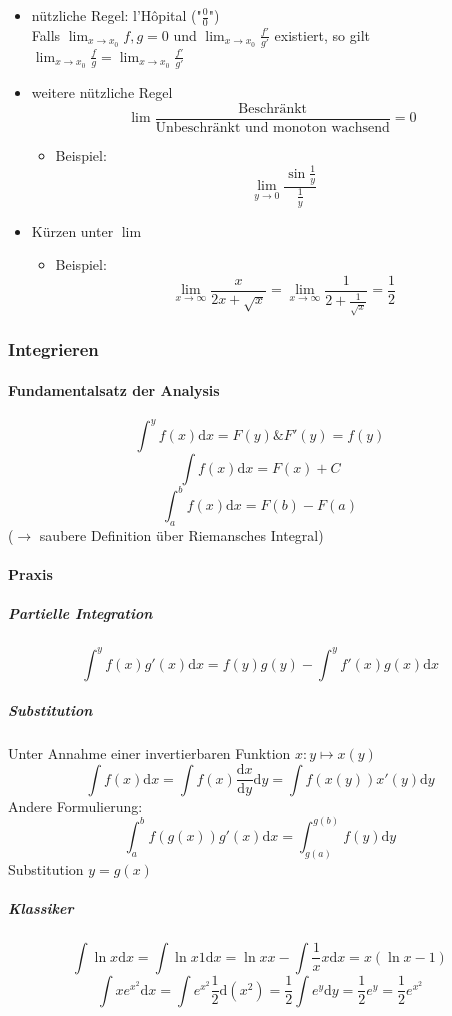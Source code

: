 \documentclass[a4paper]{scrartcl}
\theoremstyle{definition}
\theoremstyle{plain}
\theoremstyle{remark}
\theoremstyle{remark}
\begin{document}
\begin{itemize}
\begin{itemize}
\item nützliche Regel: l'Hôpital ("$\frac{0}{0}$") \\
        Falls $\lim_{x\to x_0} f,g = 0$ und $\lim_{x\to x_0} \frac{f'}{g'}$ existiert, so gilt $\lim_{x\to x_0}\frac{f}{g} = \lim_{x\to x_0} \frac{f'}{g'}$
\item weitere nützliche Regel \[\lim \frac{\text{Beschränkt}}{\text{Unbeschränkt und monoton wachsend}} = 0\]
\begin{itemize}
\item Beispiel: \[\lim_{y\to 0} \frac{\sin{\frac{1}{y}}}{\frac{1}{y}}\]
\end{itemize}
\item Kürzen unter $\lim$
\begin{itemize}
\item Beispiel: \[\lim_{x\to\infty} \frac{x}{2x + \sqrt{x}} = \lim_{x\to\infty}\frac{1}{2+\frac{1}{\sqrt{x}}} = \frac{1}{2}\]
\end{itemize}
\end{itemize}
\end{itemize}
\subsubsection{Integrieren}
\label{sec-2-2-3}
\paragraph{Fundamentalsatz der Analysis}
\label{sec-2-2-3-1}
\[\int^y f(x)\mathrm{d}x = F(y) \&  F'(y) = f(y)\]
\[\int f(x)\mathrm{d}x = F(x) + C\]
\[\int_a^b f(x)\mathrm{d}x = F(b) - F(a)\]
($\to$ saubere Definition über Riemansches Integral)
\paragraph{Praxis}
\label{sec-2-2-3-2}
\subparagraph{Partielle Integration}
\label{sec-2-2-3-2-1}
\[\int^y f(x)g'(x)\mathrm{d}x = f(y)g(y) - \int^y f'(x)g(x)\mathrm{d}x\]
\subparagraph{Substitution}
\label{sec-2-2-3-2-2}
Unter Annahme einer invertierbaren Funktion $x: y\mapsto x(y)$
\[\int f(x)\mathrm{d}x = \int f(x)\frac{\mathrm{d}x}{\mathrm{d}y}\mathrm{d}y = \int f(x(y)) x'(y)\mathrm{d}y\]
Andere Formulierung: \[\int_a^b f(g(x))g'(x)\mathrm{d}x = \int_{g(a)}^{g(b)}f(y)\mathrm{d}y\]
Substitution $y=g(x)$
\subparagraph{Klassiker}
\label{sec-2-2-3-2-3}
\[\int \ln{x}\mathrm{d}x = \int \ln{x}1\mathrm{d}x = \ln{x}x - \int \frac{1}{x}x\mathrm{d}x = x(\ln{x} - 1)\]
\[\int x e^{x^2}\mathrm{d}x = \int e^{x^2}\frac{1}{2}\mathrm{d}(x^2) = \frac{1}{2}\int e^y \mathrm{d}y = \frac{1}{2}e^y = \frac{1}{2}e^{x^2}\]
\end{document}
